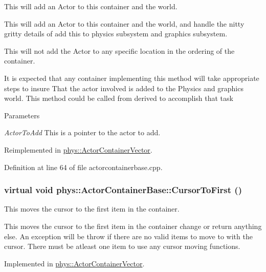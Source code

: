 This will add an Actor to this container and the world. 

This will add an Actor to this container and the world, and handle the nitty gritty details of add this to physics subsystem and graphics subsystem. \par
\par
 This will not add the Actor to any specific location in the ordering of the container. \par
\par
 It is expected that any container implementing this method will take appropriate steps to insure That the actor involved is added to the Physics and graphics world. This method could be called from derived to accomplish that task 
\begin{DoxyParams}{Parameters}
\item[{\em ActorToAdd}]This is a pointer to the actor to add. \end{DoxyParams}


Reimplemented in \hyperlink{classphys_1_1ActorContainerVector_a4bc3e38f16caddee021a97739bebaf6e}{phys::ActorContainerVector}.



Definition at line 64 of file actorcontainerbase.cpp.

\hypertarget{classphys_1_1ActorContainerBase_ab1a44758d7c17e70ff2e0f8de47424c3}{
\subsubsection[{CursorToFirst}]{\setlength{\rightskip}{0pt plus 5cm}virtual void phys::ActorContainerBase::CursorToFirst ()}}
\label{d1/d00/classphys_1_1ActorContainerBase_ab1a44758d7c17e70ff2e0f8de47424c3}


This moves the cursor to the first item in the container. 

This moves the cursor to the first item in the container change or return anything else. An exception will be throw if there are no valid items to move to with the cursor. There must be atleast one item to use any cursor moving functions. 

Implemented in \hyperlink{classphys_1_1ActorContainerVector_ad9c2eb2a9405dcf687c86745afc9c031}{phys::ActorContainerVector}.

